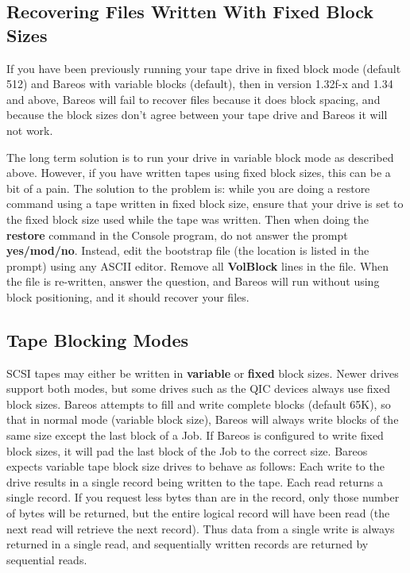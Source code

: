 {\subsection{Recovering Files Written With Fixed Block Sizes}

If you have been previously running your tape drive in fixed block mode
(default 512) and Bareos with variable blocks (default), then in version
1.32f-x and 1.34 and above, Bareos will fail to recover files because it does
block spacing, and because the block sizes don't agree between your tape drive
and Bareos it will not work.

The long term solution is to run your drive in variable block mode as
described above. However, if you have written tapes using fixed block sizes,
this can be a bit of a pain. The solution to the problem is: while you are
doing a restore command using a tape written in fixed block size, ensure that
your drive is set to the fixed block size used while the tape was written.
Then when doing the {\bf restore} command in the Console program, do not
answer the prompt {\bf yes/mod/no}. Instead, edit the bootstrap file (the
location is listed in the prompt) using any ASCII editor. Remove all {\bf
VolBlock} lines in the file. When the file is re-written, answer the question,
and Bareos will run without using block positioning, and it should recover
your files.

\label{BlockModes}
\subsection{Tape Blocking Modes}

SCSI tapes may either be written in {\bf variable} or {\bf fixed} block sizes.
Newer drives support both modes, but some drives such as the QIC devices
always use fixed block sizes. Bareos attempts to fill and write complete
blocks (default 65K), so that in normal mode (variable block size), Bareos
will always write blocks of the same size except the last block of a Job. If
Bareos is configured to write fixed block sizes, it will pad the last block of
the Job to the correct size. Bareos expects variable tape block size drives to
behave as follows: Each write to the drive results in a single record being
written to the tape. Each read returns a single record. If you request less
bytes than are in the record, only those number of bytes will be returned, but
the entire logical record will have been read (the next read will retrieve the
next record). Thus data from a single write is always returned in a single
read, and sequentially written records are returned by sequential reads.

}
